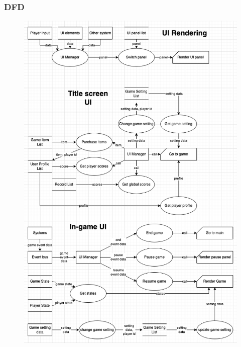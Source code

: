 \documentclass[11pt]{article}
\begin{document}
\subsubsection{DFD}
\begin{figure}[H]
    \centering
    \includegraphics*[scale=0.4]{UI_DFD.png}
\end{figure}
\end{document}
